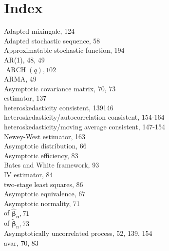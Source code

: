 \documentclass[10pt]{article}
\begin{document}
\section*{Index}
Adapted mixingale, 124\\
Adapted stochastic sequence, 58\\
Approximatable stochastic function, 194\\
AR(1), 48, 49\\
$\operatorname{ARCH}(q), 102$\\
ARMA, 49\\
Asymptotic covariance matrix, 70, 73\\
estimator, 137\\
heteroskedasticity consistent, 139146\\
heteroskedasticity/autocorrelation consistent, 154-164\\
heteroskedasticity/moving average consistent, 147-154\\
Newey-West estimator, 163\\
Asymptotic distribution, 66\\
Asymptotic efficiency, 83\\
Bates and White framework, 93\\
IV estimator, 84\\
two-stage least squares, 86\\
Asymptotic equivalence, 67\\
Asymptotic normality, 71\\
of $\hat{\boldsymbol{\beta}}_{\boldsymbol{n}}, 71$\\
of $\tilde{\boldsymbol{\beta}}_{n}, 73$\\
Asymptotically uncorrelated process, 52, 139, 154\\
avar, 70, 83
\end{document}
